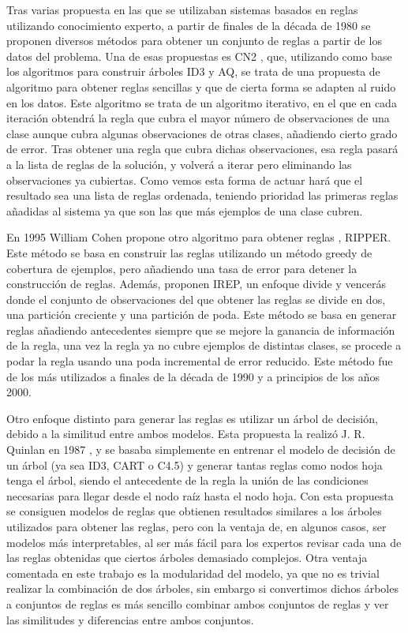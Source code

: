 Tras varias propuesta en las que se utilizaban sistemas basados en reglas utilizando conocimiento experto, a partir de finales de la década de 1980 se proponen diversos métodos para obtener un conjunto de reglas a partir de los datos del problema. Una de esas propuestas es CN2 \cite{propuestaCN2}, que, utilizando como base los algoritmos para construir árboles ID3 y AQ, se trata de una propuesta de algoritmo para obtener reglas sencillas y que de cierta forma se adapten al ruido en los datos. Este algoritmo se trata de un algoritmo iterativo, en el que en cada iteración obtendrá la regla que cubra el mayor número de observaciones de una clase aunque cubra algunas observaciones de otras clases, añadiendo cierto grado de error. Tras obtener una regla que cubra dichas observaciones, esa regla pasará a la lista de reglas de la solución, y volverá a iterar pero eliminando las observaciones ya cubiertas. Como vemos esta forma de actuar hará que el resultado sea una lista de reglas ordenada, teniendo prioridad las primeras reglas añadidas al sistema ya que son las que más ejemplos de una clase cubren.

En 1995 William Cohen propone otro algoritmo para obtener reglas \cite{propuestaRIPPER}, RIPPER. Este método se basa en construir las reglas utilizando un método greedy de cobertura de ejemplos, pero añadiendo una tasa de error para detener la construcción de reglas. Además, proponen IREP, un enfoque divide y vencerás donde el conjunto de observaciones del que obtener las reglas se divide en dos, una partición creciente y una partición de poda. Este método se basa en generar reglas añadiendo antecedentes siempre que se mejore la ganancia de información de la regla, una vez la regla ya no cubre ejemplos de distintas clases, se procede a podar la regla usando una poda incremental de error reducido. Este método fue de los más utilizados a finales de la década de 1990 y a principios de los años 2000.

Otro enfoque distinto para generar las reglas es utilizar un árbol de decisión, debido a la similitud entre ambos modelos. Esta propuesta la realizó J. R. Quinlan en 1987 \cite{reglasUsandoArboles}, y se basaba simplemente en entrenar el modelo de decisión de un árbol (ya sea ID3, CART o C4.5) y generar tantas reglas como nodos hoja tenga el árbol, siendo el antecedente de la regla la unión de las condiciones necesarias para llegar desde el nodo raíz hasta el nodo hoja. Con esta propuesta se consiguen modelos de reglas que obtienen resultados similares a los árboles utilizados para obtener las reglas, pero con la ventaja de, en algunos casos, ser modelos más interpretables, al ser más fácil para los expertos revisar cada una de las reglas obtenidas que ciertos árboles demasiado complejos. Otra ventaja comentada en este trabajo es la modularidad del modelo, ya que no es trivial realizar la combinación de dos árboles, sin embargo si convertimos dichos árboles a conjuntos de reglas es más sencillo combinar ambos conjuntos de reglas y ver las similitudes y diferencias entre ambos conjuntos.

